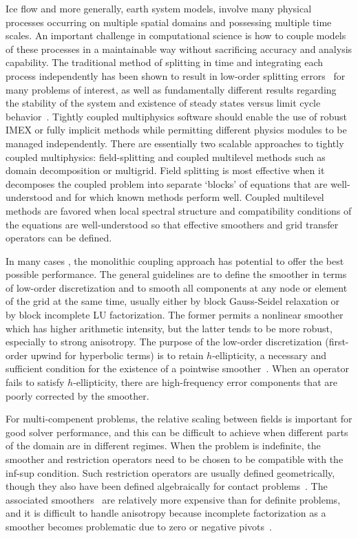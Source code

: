 Ice flow and more generally, earth system models, involve many physical processes occurring on multiple spatial domains and possessing multiple time scales.
An important challenge in computational science is how to couple models of these processes in a maintainable way without sacrificing accuracy and analysis capability.
The traditional method of splitting in time and integrating each process independently has been shown to result in low-order splitting errors~\cite{knoll2003bat,mousseau2002inc} for many problems of interest, as well as fundamentally different results regarding the stability of the system \cite{estep2008posteriori} and existence of steady states versus limit cycle behavior~\cite{jardin20081d}.
Tightly coupled multiphysics software should enable the use of robust IMEX or fully implicit methods while permitting different physics modules to be managed independently.
There are essentially two scalable approaches to tightly coupled multiphysics: field-splitting and coupled multilevel methods such as domain decomposition or multigrid.
Field splitting is most effective when it decomposes the coupled problem into separate `blocks' of equations that are well-understood and for which known methods perform well.
Coupled multilevel methods are favored when local spectral structure and compatibility conditions of the equations are well-understood so that effective smoothers and grid transfer operators can be defined.

In many cases \cite{rannacher2000finite,jameson2001many,adams2010toward}, the monolithic coupling approach has potential to offer the best possible performance.
The general guidelines are to define the smoother in terms of low-order discretization and to smooth all components at any node or element of the grid at the same time, usually either by block Gauss-Seidel relaxation or by block incomplete LU factorization.
The former permits a nonlinear smoother which has higher arithmetic intensity, but the latter tends to be more robust, especially to strong anisotropy.
The purpose of the low-order discretization (first-order upwind for hyperbolic terms) is to retain $h$-ellipticity, a necessary and sufficient condition for the existence of a pointwise smoother~\cite{brandt1979multigrid,trottenberg2001multigrid}.
When an operator fails to satisfy $h$-ellipticity, there are high-frequency error components that are poorly corrected by the smoother.

For multi-compenent problems, the relative scaling between fields is important for good solver performance, and this can be difficult to achieve when different parts of the domain are in different regimes.
When the problem is indefinite, the smoother and restriction operators need to be chosen to be compatible with the inf-sup condition.
Such restriction operators are usually defined geometrically, though they also have been defined algebraically for contact problems~\cite{adams2004amm}.
The associated smoothers~\cite{vanka1986block} are relatively more expensive than for definite problems, and it is difficult to handle anisotropy because incomplete factorization as a smoother becomes problematic due to zero or negative pivots~\cite{higham2002accuracy,deniet2007solving}.


